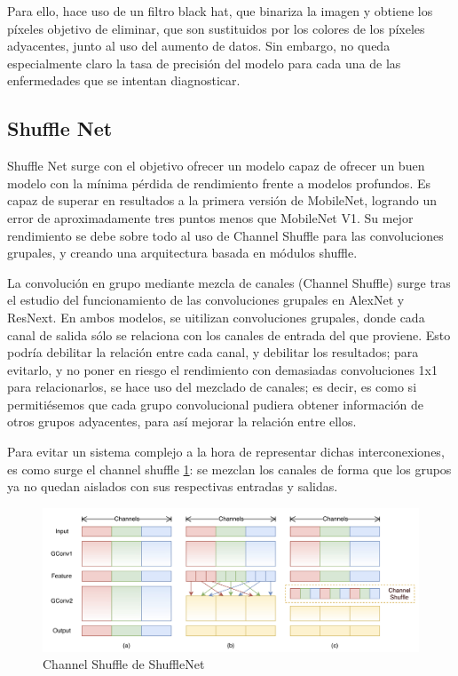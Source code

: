 Para ello, hace uso de un filtro black hat, que binariza la imagen y obtiene los píxeles objetivo de eliminar, que son sustituidos por los colores de los píxeles adyacentes, junto al uso del aumento de datos. Sin embargo, no queda especialmente claro la tasa de precisión del modelo para cada una de las enfermedades que se intentan diagnosticar.

\subsection{Shuffle Net}

Shuffle Net \cite{zhang2017shufflenet,shufflenetreview} surge con el objetivo ofrecer un modelo capaz de ofrecer un buen modelo con la mínima pérdida de rendimiento frente a modelos profundos. Es capaz de superar en resultados a la primera versión de MobileNet, logrando un error de aproximadamente tres puntos menos que MobileNet V1. Su mejor rendimiento se debe sobre todo al uso de Channel Shuffle para las convoluciones grupales, y creando una arquitectura basada en módulos shuffle.

La convolución en grupo mediante mezcla de canales (Channel Shuffle) surge tras el estudio del funcionamiento de las convoluciones grupales en 	AlexNet\cite{NIPS2012_c399862d} y ResNext. En ambos modelos, se uitilizan convoluciones grupales, donde cada canal de salida sólo se relaciona con los canales de entrada del que proviene. Esto podría debilitar la relación entre cada canal, y debilitar los resultados; para evitarlo, y no poner en riesgo el rendimiento con demasiadas convoluciones 1x1 para relacionarlos, se hace uso del mezclado de canales; es decir, es como si permitiésemos que cada grupo convolucional pudiera obtener información de otros grupos adyacentes, para así mejorar la relación entre ellos.

Para evitar un sistema complejo a la hora de representar dichas interconexiones, es como surge el channel shuffle \ref{shufflechannels}: se mezclan los canales de forma que los grupos ya no quedan aislados con sus respectivas entradas y salidas.

    \begin{figure}[H]
	\label{shufflechannels}
	\centering
	\includegraphics[scale = 0.2]{imagenes/shufflechannels.png}
	\caption{Channel Shuffle de ShuffleNet}
\end{figure}


